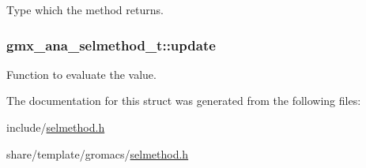 \-Type which the method returns. \hypertarget{structgmx__ana__selmethod__t_a18d9fe0bff35116b4e12cc63c381fb47}{
\subsubsection[{update}]{ {\bf gmx\-\_\-ana\-\_\-selmethod\-\_\-t\-::update}}}\label{structgmx__ana__selmethod__t_a18d9fe0bff35116b4e12cc63c381fb47}
\-Function to evaluate the value. 

\-The documentation for this struct was generated from the following files\-:\begin{DoxyCompactItemize}
\item 
include/\hyperlink{include_2selmethod_8h}{selmethod.\-h}\item 
share/template/gromacs/\hyperlink{share_2template_2gromacs_2selmethod_8h}{selmethod.\-h}\end{DoxyCompactItemize}
